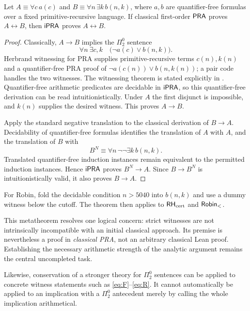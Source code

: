 \begin{theorem}
\label{thm:transfer}
Let $A\equiv\forall c\,a(c)$ and
$B\equiv\forall n\,\exists k\,b(n,k)$, where $a,b$ are
quantifier-free formulas over a fixed primitive-recursive language.
If classical first-order $\mathsf{PRA}$ proves $A\leftrightarrow B$, then
$\mathsf{iPRA}$ proves $A\leftrightarrow B$.
\end{theorem}
\begin{proof}
Classically, $A\to B$ implies the $\Pi^0_2$ sentence
\[
 \forall n\ \exists c,k\quad
       \bigl(\neg a(c)\vee b(n,k)\bigr).
\]
Herbrand witnessing for PRA supplies primitive-recursive terms
$c(n),k(n)$ and a quantifier-free PRA proof of
$\neg a(c(n))\vee b(n,k(n))$; a pair code handles the two witnesses.
The witnessing theorem is stated explicitly in
\cite[p.~13]{AvigadMining}. Quantifier-free arithmetic predicates
are decidable in $\mathsf{iPRA}$, so this quantifier-free derivation can be
read intuitionistically. Under $A$ the first disjunct is impossible,
and $k(n)$ supplies the desired witness. This proves $A\to B$.

Apply the standard negative translation to the classical derivation
of $B\to A$. Decidability of quantifier-free formulas identifies
the translation of $A$ with $A$, and the translation of $B$ with
\[
 B^N\equiv\forall n\,\neg\neg\exists k\,b(n,k).
\]
Translated quantifier-free induction instances remain equivalent
to the permitted induction instances. Hence $\mathsf{iPRA}$ proves
$B^N\to A$. Since $B\to B^N$ is intuitionistically valid, it also
proves $B\to A$.
\end{proof}

For Robin, fold the decidable condition $n>5040$ into $b(n,k)$ and
use a dummy witness below the cutoff. The theorem then applies to
$\mathsf{RH}_{\rm cert}$ and $\mathsf{Robin}_{<}$.

This metatheorem resolves one logical concern: strict witnesses are
not intrinsically incompatible with an initial classical approach.
Its premise is nevertheless a proof in \emph{classical PRA}, not
an arbitrary classical Lean proof. Establishing the necessary
arithmetic strength of the analytic argument remains the central
uncompleted task.

Likewise, conservation of a stronger theory for $\Pi^0_2$ sentences
can be applied to concrete witness statements such as
\eqref{eq:F}--\eqref{eq:R}. It cannot automatically be applied to
an implication with a $\Pi^0_2$ antecedent merely by calling the
whole implication arithmetical.
